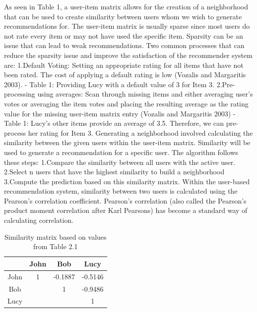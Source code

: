 As seen in Table 1, a user-item matrix allows for the creation of a neighborhood that can be used to create similarity between users whom we wish to generate recommendations for. The user-item matrix is usually sparse since most users do not rate every item or may not have used the specific item.
Sparsity can be an issue that can lead to weak recommendations. Two common processes that can reduce the sparsity issue and improve the satisfaction of the recommender system are:
1.Default Voting: Setting an appropriate rating for all items that have not been rated. The cost of applying a default rating is low (Vozalis and Margaritis 2003).   - Table 1: Providing Lucy with a default value of 3 for Item 3.
2.Pre-processing using averages: Scan through missing items and either averaging user’s votes or averaging the item votes and placing the resulting average as the rating value for the missing user-item matrix entry (Vozalis and Margaritis 2003)    - Table 1: Lucy’s other items provide an average of 3.5. Therefore, we can pre-process her rating for Item 3.
Generating a neighborhood involved calculating the similarity between the given users within the user-item matrix. Similarity will be used to generate a recommendation for a specific user.
The algorithm follows these steps:
1.Compare the similarity between all users with the active user.
2.Select n users that have the highest similarity to build a neighborhood
3.Compute the prediction based on this similarity matrix.
Within the user-based recommendation system, similarity between two users is calculated using the Pearson’s correlation coefficient. Pearson’s correlation (also called the Pearson's product moment correlation after Karl Pearsons) has become a standard way of calculating correlation.

\begin{table}[ht]
\caption{Similarity matrix based on values from Table 2.1} %
\centering  %
\begin{tabular}{c c c c} %
\hline\hline                        %
 & John & Bob& Lucy \\ [0.5ex] %
\hline                  %

John & 1 & -0.1887  & -0.5146 \\
Bob &  & 1 & -0.9486 \\
Lucy &  & & 1 \\[1ex]      %
\hline %
\end{tabular}
\label{table:3} %
\end{table}

